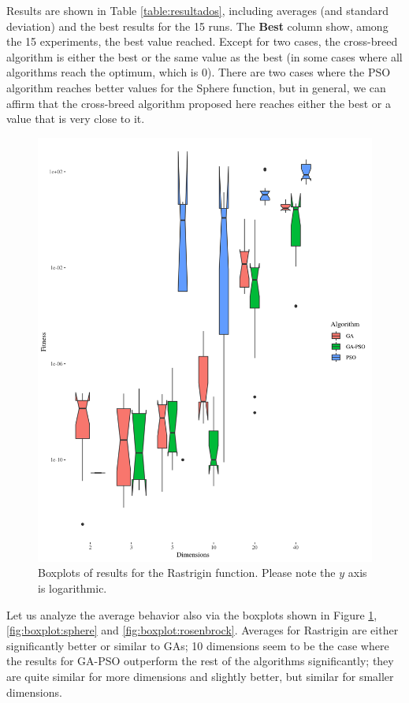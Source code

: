 \documentclass[runningheads]{llncs}
\begin{document}
Results are shown in Table \ref{table:resultados}, including averages
(and standard deviation) and the best results for the 15 runs. The {\bf
  Best} column show, among the 15 experiments, the best value
reached. Except for two cases, the cross-breed algorithm is either the
best or the same value as the best (in some cases where all algorithms
reach the optimum, which is 0). There are two cases where the PSO
algorithm reaches better values for the Sphere function, but in
general, we can affirm that the cross-breed algorithm proposed here
reaches either the best or a value that is very close to it.
%
\begin{figure}[h!tb]
  \centering
  \includegraphics[height=0.4\textheight]{img/rastrigin-boxplot.png}
  \caption{Boxplots of results for the Rastrigin function. Please note the $y$ axis is logarithmic.\label{fig:boxplot:rastrigin}}
\end{figure}

Let us analyze the average behavior also via the boxplots shown
in Figure \ref{fig:boxplot:rastrigin},  \ref{fig:boxplot:sphere} and
\ref{fig:boxplot:rosenbrock}. Averages for Rastrigin are either
significantly better or similar to GAs; 10 dimensions seem to be the
case where the results for GA-PSO outperform the rest of
the algorithms significantly; they are quite similar for more dimensions and
slightly better, but similar for smaller dimensions. 
\end{document}
